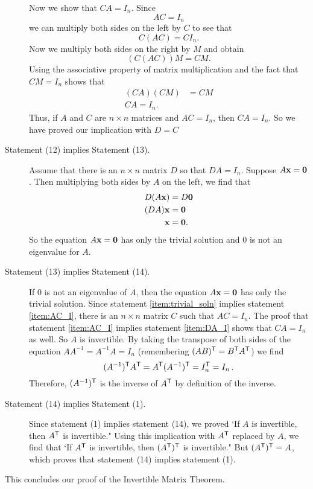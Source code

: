 \begin{description}
Now we show that $CA = I_n$. Since 
\[AC = I_n\]
we can multiply both sides on the left by $C$ to see that 
\[C(AC) = CI_n.\]
Now we multiply both sides on the right by $M$ and obtain
\[(C(AC))M = CM.\]
Using the associative property of matrix multiplication and the fact that $CM = I_n$ shows that 
\begin{align*}
(CA)(CM) &= CM \\
CA = I_n.
\end{align*}
Thus, if $A$ and $C$ are $n \times n$ matrices and $AC = I_n$, then $CA = I_n$. So we have proved our implication with $D = C$
\item[Statement (12) implies Statement (13).] Assume that there is an $n \times n$ matrix $D$ so that $DA = I_n$. Suppose $A \mathbf{x} = \mathbf{0}$. Then multiplying both sides by $A$ on the left, we find that
\begin{align*}
D(A\mathbf{x}) &= D\mathbf{0} \\
(DA) \mathbf{x} &= \mathbf{0} \\
\mathbf{x} &= \mathbf{0}.
\end{align*}
So the equation $A \mathbf{x} = \mathbf{0}$ has only the trivial solution and $0$ is not an eigenvalue for $A$. 
\item[Statement (13) implies Statement (14).] If 0 is not an eigenvalue of $A$, then the equation $A \mathbf{x} = \mathbf{0}$ has only the trivial solution. Since statement \ref{item:trivial_soln} implies statement \ref{item:AC_I}, there is an $n \times n$ matrix $C$ such that $AC = I_n$. The proof that statement \ref{item:AC_I} implies statement \ref{item:DA_I} shows that $CA = I_n$ as well. So $A$ is invertible. By taking the transpose of both sides of the equation $AA^{-1}=A^{-1}A=I_n$ (remembering $(AB)^{\mathsf{T}}= B^{\mathsf{T}}A^{\mathsf{T}}$) we find
\[ (A^{-1})^{\mathsf{T}} A^{\mathsf{T}} = A^{\mathsf{T}} (A^{-1})^{\mathsf{T}} = I_n^{\mathsf{T}}=I_n \,.\]
Therefore, $(A^{-1})^{\mathsf{T}}$ is the inverse of $A^{\mathsf{T}}$ by definition of the inverse.
\item[Statement (14) implies Statement (1).] Since statement (1) implies statement (14), we proved `If $A$ is invertible, then $A^{\mathsf{T}}$ is invertible." Using this implication with $A^{\mathsf{T}}$ replaced by $A$, we find that `If $A^{\mathsf{T}}$ is invertible, then $(A^{\mathsf{T}})^{\mathsf{T}}$ is invertible." But $(A^{\mathsf{T}})^{\mathsf{T}}=A$, which proves that statement (14) implies statement (1).
\end{description}
This concludes our proof of the Invertible Matrix Theorem.



\ExampleIntro

